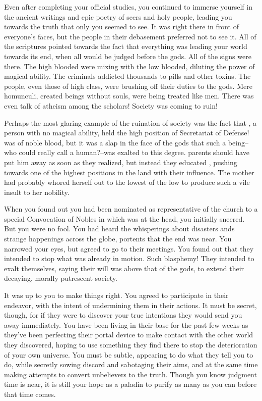 \documentclass[char]{guildcamp3}
\begin{document}
Even after completing your official studies, you continued to immerse yourself in the ancient writings and epic poetry of seers and holy people, leading you towards the truth that only you seemed to see. It was right there in front of everyone's faces, but the people in their debasement preferred not to see it. All of the scriptures pointed towards the fact that everything was leading your world towards its end, when all would be judged before the gods. All of the signs were there. The high blooded were mixing with the low blooded, diluting the power of magical ability. The criminals addicted thousands to pills and other toxins. The people, even those of high class, were brushing off their duties to the gods. Mere homunculi, created beings without souls, were being treated like men. There was even talk of atheism among the scholars! Society was coming to ruin!

Perhaps the most glaring example of the ruination of society was the fact that \cNobleOne{\intro}, a person with no magical ability, held the high position of Secretariat of Defense! \cNobleOne{\They} was of noble blood, but it was a slap in the face of the gods that such a being--who could really call \cNobleOne{\them} a human?--was exalted to this degree. \cNobleOne{\Their} parents should have put him away as soon as they realized, but instead they educated \cNobleOne{\them}, pushing \cNobleOne{\them} towards one of the highest positions in the land with their influence. The mother had probably whored herself out to the lowest of the low to produce such a vile insult to her nobility.

When you found out you had been nominated as representative of the church to a special Convocation of Nobles in which \cNobleOne{\they} was at the head, you initially sneered. But you were no fool. You had heard the whisperings about disasters ands strange happenings across the globe, portents that the end was near. You narrowed your eyes, but agreed to go to their meetings. You found out that they intended to stop what was already in motion. Such blasphemy! They intended to exalt themselves, saying their will was above that of the gods, to extend their decaying, morally putrescent society.

It was up to you to make things right. You agreed to participate in their endeavor, with the intent of undermining them in their actions. It must be secret, though, for if they were to discover your true intentions they would send you away immediately. You have been living in their base for the past few weeks as they've been perfecting their portal device to make contact with the other world they discovered, hoping to use something they find there to stop the deterioration of your own universe. You must be subtle, appearing to do what they tell you to do, while secretly sowing discord and sabotaging their aims, and at the same time making attempts to convert unbelievers to the truth. Though you know judgment time is near, it is still your hope as a paladin to purify as many as you can before that time comes.
\end{document}
